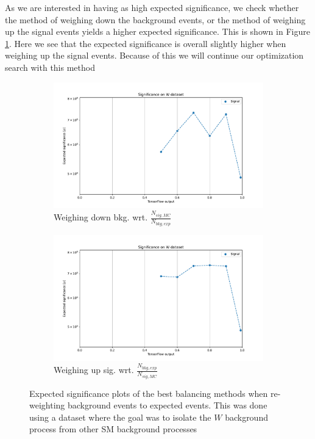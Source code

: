 \documentclass[12pt, a4paper]{book}
\begin{document}
\noindent As we are interested in having as high expected significance, we check whether the method of weighing down the background events, or the method of weighing up the signal events yields a higher expected significance. 
This is shown in Figure \ref{fig:WSIG}. Here we see that the expected significance is overall slightly higher when weighing up the signal events. Because of this we will continue our optimization search with this method \\
\begin{figure}[!ht]
	\centering
      \begin{subfigure}[b]{0.49\textwidth}
            \centering
            \includegraphics[width=1\textwidth]{bkg_exp/EXP_SIG.pdf}
            \caption{Weighing down bkg. wrt. $\frac{N_{sig,MC}}{N_{bkg,exp}}$ }
         \end{subfigure}
         \hfill
         \begin{subfigure}[b]{0.49\textwidth}
            \centering
            \includegraphics[width=1\textwidth]{sig_exp/EXP_SIG.pdf}
            \caption{Weighing up sig. wrt. $\frac{N_{bkg,exp}}{N_{sig,MC}}$}
         \end{subfigure}
      \caption[Significance plots for re-weighting and balancing W dataset on NNs]{Expected significance plots of the best balancing methods when re-weighting background events to expected events. 
      This was done using a dataset where the goal was to isolate the $W$ background process from other SM background processes}\label{fig:WSIG}
\end{figure}
\end{document}
